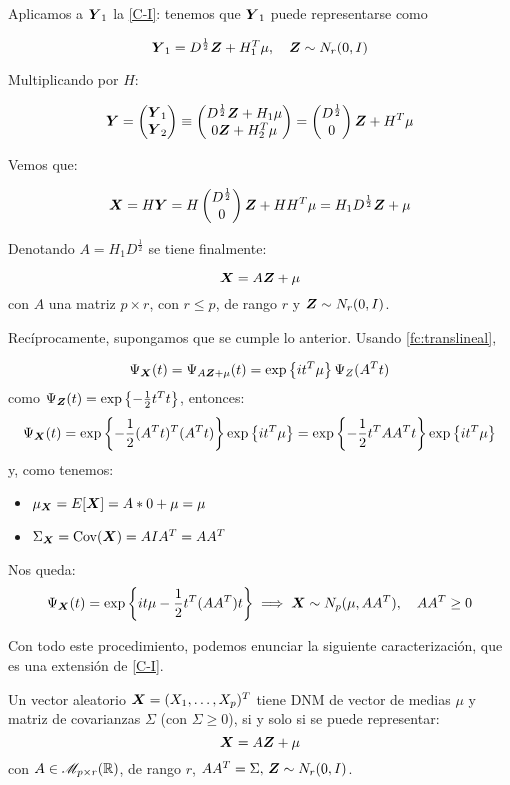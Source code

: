 Aplicamos a $\boldsymbol{Y}_1$ la \hyperref[posvar:car-i]{[C-I]}: tenemos que $\boldsymbol{Y}_1$ puede representarse como

\[
\boldsymbol{Y}_1 = D^{\frac{1}{2}}\boldsymbol{Z} + H_1^T \mu, \quad \boldsymbol{Z} \sim N_r(0,I) 
\]

Multiplicando por $H$:

\[
\boldsymbol{Y} = \begin{pmatrix} \boldsymbol{Y}_1 \\ \boldsymbol{Y}_2 \end{pmatrix} \equiv \begin{pmatrix} D^{\frac{1}{2}} \boldsymbol{Z} + H_1\mu \\ 0\boldsymbol{Z}+ H_2^T \mu\end{pmatrix} = \begin{pmatrix} D^{\frac{1}{2}} \\ 0 \end{pmatrix}\boldsymbol{Z} + H^T \mu
\]

Vemos que:

\[
\boldsymbol{X} = H\boldsymbol{Y} = H\begin{pmatrix} D^{\frac{1}{2}} \\ 0\end{pmatrix} \boldsymbol{Z} + HH^T\mu = H_1D^{\frac{1}{2}}\boldsymbol{Z} + \mu
\]

Denotando $A= H_1D^{\frac{1}{2}}$ se tiene finalmente:

\[
\boldsymbol{X} = A\boldsymbol{Z} + \mu
\]
con $A$ una matriz $p\times r$, con $r\leq p$, de rango $r$ y $\boldsymbol{Z}\sim N_r(0,I)$.

Recíprocamente, supongamos que se cumple lo anterior. Usando \ref{fc:translineal},

\[
\Psi_{\boldsymbol{X}}(t) = \Psi_{A\boldsymbol{Z} + \mu}(t)  = \exp\left\{it^T \mu\right\}\Psi_Z(A^Tt)
\]
como $\Psi_{\boldsymbol{Z}}(t) = \exp\left\{-\frac{1}{2}t^T t\right\}$, entonces:
\[
 \Psi_{\boldsymbol{X}}(t) = \exp\left\{-\frac{1}{2}(A^T t)^T(A^T t)\right\} \exp\left\{it^T \mu\right\} = \exp\left\{-\frac{1}{2}t^T A A^T t\right\} \exp\left\{it^T \mu\right\} 
\]
y, como tenemos:
\begin{itemize}
  \item $\mu_{\boldsymbol{X}} = E[\boldsymbol{X}]=A*0 +\mu = \mu$
  \item $\Sigma_{\boldsymbol{X}} = \operatorname{Cov}(\boldsymbol{X}) = AIA^T = AA^T$
\end{itemize}
Nos queda:
\[
 \Psi_{\boldsymbol{X}}(t)= \exp\left\{it\mu - \frac{1}{2}t^T(AA^T)t\right\} \implies \boldsymbol{X} \sim N_p(\mu, AA^T), \quad AA^T \geq 0
\]

Con todo este procedimiento, podemos enunciar la siguiente caracterización, que es una extensión de \hyperref[posvar:car-i]{[C-I]}.
\begin{nprop}[Caracterización I]
  Un vector aleatorio $\boldsymbol{X} = (X_1,\dots,X_p)^T$ tiene DNM de vector de medias $\mu$ y matriz de covarianzas $\Sigma$ (con $\Sigma \geq 0$), si y solo si se puede representar:
  \[
  \boldsymbol{X} = A\boldsymbol{Z} + \mu
  \] con $A\in \mathscr{M}_{p\times r}(\mathbb{R})$, de rango $r$, $AA^T = \Sigma,\, \boldsymbol{Z}\sim N_r(0,I)$.
\end{nprop}

